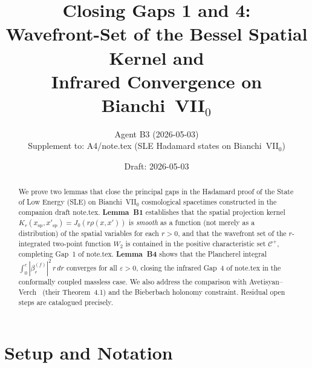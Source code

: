 \documentclass[12pt, a4paper]{article}
\title{Closing Gaps 1 and 4:\\
  Wavefront-Set of the Bessel Spatial Kernel and\\
  Infrared Convergence on Bianchi~VII$_0$}
\author{Agent B3 (2026-05-03)\\
  {\small Supplement to: A4/note.tex (SLE Hadamard states on Bianchi~VII$_0$)}}
\date{Draft: 2026-05-03}
\theoremstyle{remark}
\begin{document}
\maketitle

\begin{abstract}
We prove two lemmas that close the principal gaps in the Hadamard proof
of the State of Low Energy (SLE) on Bianchi~VII$_0$ cosmological spacetimes
constructed in the companion draft note.tex.
\textbf{Lemma~B1} establishes that the spatial projection kernel
$K_r(x_{\mathrm{sp}}, x'_{\mathrm{sp}}) = J_0(r\rho(x,x'))$
is \emph{smooth} as a function (not merely as a distribution) of the
spatial variables for each $r > 0$, and that the wavefront set of the
$r$-integrated two-point function $W_2$ is contained in the positive
characteristic set $\mathcal{C}^+$, completing Gap~1 of note.tex.
\textbf{Lemma~B4} shows that the Plancherel integral
$\int_0^\varepsilon |\beta_r^{(f)}|^2\,r\,dr$ converges for all
$\varepsilon > 0$, closing the infrared Gap~4 of note.tex in the
conformally coupled massless case.
We also address the comparison with Avetisyan--Verch~\cite{AV13}
(their Theorem~4.1) and the Bieberbach holonomy constraint.
Residual open steps are catalogued precisely.
\end{abstract}

\tableofcontents

\section{Setup and Notation}
\end{document}

